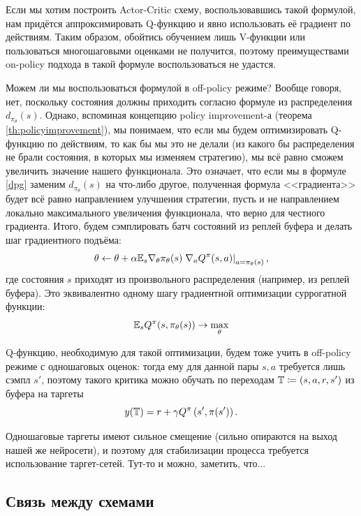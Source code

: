 Если мы хотим построить Actor-Critic схему, воспользовавшись такой формулой, нам придётся аппроксимировать Q-функцию и явно использовать её градиент по действиям. Таким образом, обойтись обучением лишь V-функции или пользоваться многошаговыми оценками не получится, поэтому преимуществами on-policy подхода в такой формуле воспользоваться не удастся.

Можем ли мы воспользоваться формулой в off-policy режиме? Вообще говоря, нет, поскольку состояния должны приходить согласно формуле из распределения $d_{\pi_\theta}(s)$. Однако, вспоминая концепцию policy improvement-а (теорема \ref{th:policyimprovement}), мы понимаем, что если мы будем оптимизировать Q-функцию по действиям, то как бы мы это не делали (из какого бы распределения не брали состояния, в которых мы изменяем стратегию), мы всё равно сможем увеличить значение нашего функционала. Это означает, что если мы в формуле \eqref{dpg} заменим $d_{\pi_\theta}(s)$ на что-либо другое, полученная формула <<градиента>> будет всё равно направлением улучшения стратегии, пусть и не направлением локально максимального увеличения функционала, что верно для честного градиента. Итого, будем сэмплировать батч состояний из реплей буфера и делать шаг градиентного подъёма: 
$$\theta \leftarrow \theta + \alpha \mathbb{E}_{s} \nabla_\theta \pi_\theta(s) \left. \nabla_a Q^{\pi}(s, a) \right|_{a = \pi_\theta(s)},$$
где состояния $s$ приходят из произвольного распределения (например, из реплей буфера). Это эквивалентно одному шагу градиентной оптимизации суррогатной функции:
\begin{equation}\label{ddpg_actor}
\mathbb{E}_s Q^{\pi}(s, \pi_{\theta}(s)) \to \max_{\theta}
\end{equation}

Q-функцию, необходимую для такой оптимизации, будем тоже учить в off-policy режиме с одношаговых оценок: тогда ему для данной пары $s,a$ требуется лишь сэмпл $s'$, поэтому такого критика можно обучать по переходам $\mathbb{T} \coloneqq (s, a, r, s')$ из буфера на таргеты
$$y(\mathbb{T}) = r + \gamma Q^{\pi}\left( s', \pi(s') \right).$$

Одношаговые таргеты имеют сильное смещение (сильно опираются на выход нашей же нейросети), и поэтому для стабилизации процесса требуется использование таргет-сетей. Тут-то и можно, заметить, что...

\subsection{Связь между схемами}

